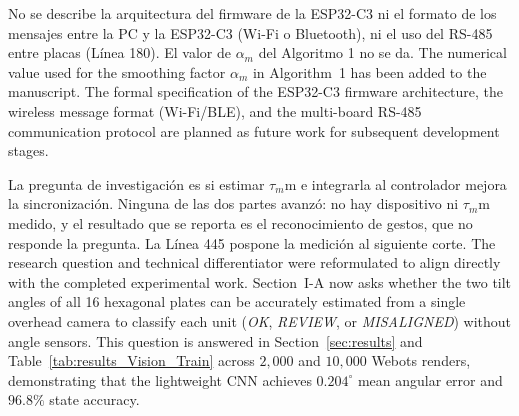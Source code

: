 \documentclass{LabDSTresponse}
\begin{document}
	{No se describe la arquitectura del firmware de la ESP32-C3 ni el formato de los mensajes entre la PC y la ESP32-C3 (Wi-Fi
		o Bluetooth), ni el uso del RS-485 entre placas (Línea 180). El valor de $\alpha_m$ del Algoritmo 1 no se da.}
	{The numerical value used for the smoothing factor $\alpha_m$ in Algorithm~1 has been added to the manuscript. The formal specification of the ESP32-C3 firmware architecture, the wireless message format (Wi-Fi/BLE), and the multi-board RS-485 communication protocol are planned as future work for subsequent development stages.}
	
	
	{La pregunta de investigación es si estimar $\tau_m$m e integrarla al controlador mejora la sincronización. Ninguna de las dos partes
		avanzó: no hay dispositivo ni $\tau_m$m medido, y el resultado que se reporta es el reconocimiento de gestos, que no responde la
		pregunta. La Línea 445 pospone la medición al siguiente corte.}
	{The research question and technical differentiator were reformulated to align directly with the completed experimental work. Section~I-A now asks whether the two tilt angles of all 16 hexagonal plates can be accurately estimated from a single overhead camera to classify each unit (\textit{OK}, \textit{REVIEW}, or \textit{MISALIGNED}) without angle sensors. This question is answered in Section~\ref{sec:results} and Table~\ref{tab:results_Vision_Train} across $2{,}000$ and $10{,}000$ Webots renders, demonstrating that the lightweight CNN achieves $0.204^\circ$ mean angular error and $96.8\%$ state accuracy.}
	
\end{document}
